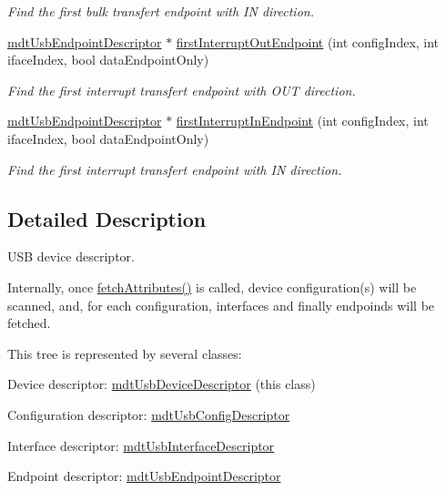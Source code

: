 \begin{DoxyCompactItemize}
\begin{DoxyCompactList}\small\item\em Find the first bulk transfert endpoint with IN direction. \end{DoxyCompactList}\item 
\hyperlink{classmdt_usb_endpoint_descriptor}{mdtUsbEndpointDescriptor} $\ast$ \hyperlink{classmdt_usb_device_descriptor_ad30b3579b0c77585df29acdfdf0fc179}{firstInterruptOutEndpoint} (int configIndex, int ifaceIndex, bool dataEndpointOnly)
\begin{DoxyCompactList}\small\item\em Find the first interrupt transfert endpoint with OUT direction. \end{DoxyCompactList}\item 
\hyperlink{classmdt_usb_endpoint_descriptor}{mdtUsbEndpointDescriptor} $\ast$ \hyperlink{classmdt_usb_device_descriptor_a95112e151605bf8b10c5eca74faaea3b}{firstInterruptInEndpoint} (int configIndex, int ifaceIndex, bool dataEndpointOnly)
\begin{DoxyCompactList}\small\item\em Find the first interrupt transfert endpoint with IN direction. \end{DoxyCompactList}\end{DoxyCompactItemize}


\subsection{Detailed Description}
USB device descriptor. 

Internally, once \hyperlink{classmdt_usb_device_descriptor_a6239e5e56e2e25a686cac98b18158500}{fetchAttributes()} is called, device configuration(s) will be scanned, and, for each configuration, interfaces and finally endpoinds will be fetched.

This tree is represented by several classes:
\begin{DoxyItemize}
\item Device descriptor: \hyperlink{classmdt_usb_device_descriptor}{mdtUsbDeviceDescriptor} (this class)
\item Configuration descriptor: \hyperlink{classmdt_usb_config_descriptor}{mdtUsbConfigDescriptor}
\item Interface descriptor: \hyperlink{classmdt_usb_interface_descriptor}{mdtUsbInterfaceDescriptor}
\item Endpoint descriptor: \hyperlink{classmdt_usb_endpoint_descriptor}{mdtUsbEndpointDescriptor}
\end{DoxyItemize}

